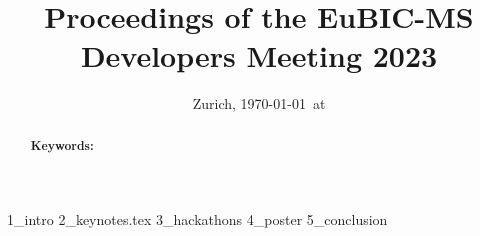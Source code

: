 \documentclass[11pt,a4paper,DIV21,abstracton,twocolumn]{scrartcl}
\title{Proceedings of the EuBIC-MS Developers Meeting 2023}
\author{
	
}
\date{{\small Zurich, \today\ at \currenttime}}
\begin{document}
\maketitle

\begin{abstract}
	
	\vspace{0.5cm}
	\textbf{Keywords:
	}
	
\end{abstract}


 {1_intro}
 {2_keynotes.tex}
 {3_hackathons}
 {4_poster}
 {5_conclusion}




\begin{table*}[ht]
\centering
\label{tab:affiliation}

\caption{Author affiliation; grouped and ordered by affiliation.}
\end{table*}
\end{document}
